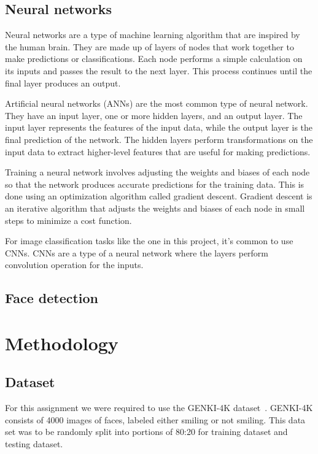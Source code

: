 \documentclass[12pt,a4paper,english
]{tunithesis}
\begin{document}
\setcounter{page}{1} 
\section{Neural networks}
Neural networks are a type of machine learning algorithm that are inspired by the human brain. They are made up of layers of nodes that work together to make predictions or classifications. Each node performs a simple calculation on its inputs and passes the result to the next layer. This process continues until the final layer produces an output.

Artificial neural networks (ANNs) are the most common type of neural network. They have an input layer, one or more hidden layers, and an output layer. The input layer represents the features of the input data, while the output layer is the final prediction of the network. The hidden layers perform transformations on the input data to extract higher-level features that are useful for making predictions.

Training a neural network involves adjusting the weights and biases of each node so that the network produces accurate predictions for the training data. This is done using an optimization algorithm called gradient descent. Gradient descent is an iterative algorithm that adjusts the weights and biases of each node in small steps to minimize a cost function.

For image classification tasks like the one in this project, it's common to use CNNs. CNNs are a type of a neural network where the layers perform convolution operation for the inputs.~\cite{dlbook}

\section{Face detection}


\chapter{Methodology}
\label{sec:methodology}
\section{Dataset}
For this assignment we were required to use the GENKI-4K dataset~\cite{genki}. GENKI-4K consists of 4000 images of faces, labeled either smiling or not smiling. This data set was to be randomly split into portions of 80:20 for training dataset and testing dataset.
\end{document}
